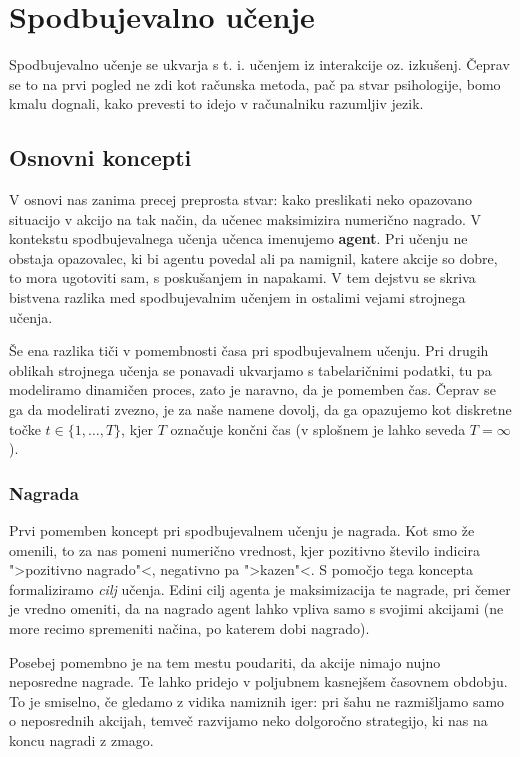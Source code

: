 \documentclass[12pt,a4paper]{amsart}
\theoremstyle{definition} %
\theoremstyle{plain} %
\begin{document}
\section{Spodbujevalno učenje}
Spodbujevalno učenje se ukvarja s t. i. učenjem iz interakcije oz. izkušenj. Čeprav se to na prvi 
pogled ne zdi kot računska metoda, pač pa stvar psihologije, bomo kmalu dognali, kako prevesti 
to idejo v računalniku razumljiv jezik.

\subsection{Osnovni koncepti}
V osnovi nas zanima precej preprosta stvar: kako preslikati neko opazovano situacijo v akcijo na 
tak način, da učenec maksimizira numerično nagrado. V kontekstu spodbujevalnega učenja učenca  
imenujemo \textbf{agent}. Pri učenju ne obstaja opazovalec, ki bi agentu povedal ali pa namignil, 
katere akcije so dobre, to mora ugotoviti sam, s poskušanjem in napakami. V tem dejstvu se skriva 
bistvena razlika med spodbujevalnim učenjem in ostalimi vejami strojnega učenja. 

Še ena razlika tiči v pomembnosti časa pri spodbujevalnem učenju. Pri drugih oblikah 
strojnega učenja se ponavadi ukvarjamo s tabelaričnimi podatki, tu pa modeliramo 
dinamičen proces, zato je naravno, da je pomemben čas. Čeprav se ga da 
modelirati zvezno, je za naše namene dovolj, da ga opazujemo kot diskretne točke $t \in 
\{1, \dots, T\} $, kjer $T$ označuje končni čas (v splošnem je lahko seveda $T = \infty$).

\subsubsection{Nagrada}
Prvi pomemben koncept pri spodbujevalnem učenju je nagrada. Kot smo že omenili, to za nas 
pomeni numerično vrednost, kjer pozitivno število indicira ">pozitivno nagrado"<, negativno pa 
">kazen"<. S pomočjo tega koncepta formaliziramo \textit{cilj} učenja. Edini cilj agenta je 
maksimizacija te nagrade, pri čemer je vredno omeniti, da na nagrado agent lahko vpliva samo 
s svojimi akcijami (ne more recimo spremeniti načina, po katerem dobi nagrado). 

Posebej pomembno je na tem mestu poudariti, da akcije nimajo nujno neposredne nagrade. Te 
lahko pridejo v poljubnem kasnejšem časovnem obdobju. To je smiselno, če gledamo z vidika 
namiznih iger: pri šahu ne razmišljamo samo o neposrednih akcijah, temveč razvijamo neko 
dolgoročno strategijo, ki nas na koncu nagradi z zmago. 
\end{document}
